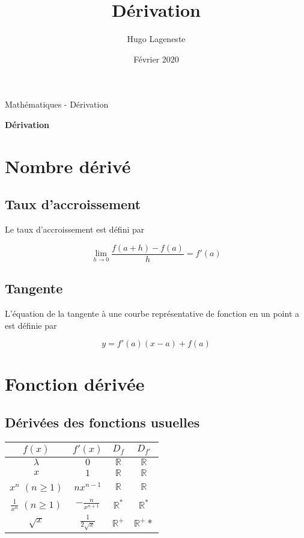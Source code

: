\documentclass[a4paper]{article}
\title{Dérivation}
\author{Hugo Lageneste}
\date{Février 2020}
\begin{document}
{Mathématiques - Dérivation}

\begin{center}
 \newcommand{\HRule}{\rule{\linewidth}{0.5mm}}
 {\huge \bfseries Dérivation}\\[0.1cm]
\end{center}

\section{Nombre dérivé}
\subsection{Taux d'accroissement}

{Le taux d'accroissement est défini par}

\[\lim\limits_{h \rightarrow 0}\frac{f(a+h)-f(a)}{h}=f\prime (a)\]

\subsection{Tangente}

{L'équation de la tangente à une courbe représentative de fonction en un point a est définie par}

\[y=f\prime(a)(x-a)+f(a)\]

\section{Fonction dérivée}

\subsection{Dérivées des fonctions usuelles}
\begin{center}
	\begin{tabular}{|c|c|c|c|}
  		\hline
  		$f(x)$ & $f\prime(x)$ & $D_f$ & $D_{f\prime}$ \\	
  		\hline
  		$\lambda$ & $0$ & $\mathbb{R}$ & $\mathbb{R}$ \\
  		\hline
  		$x$ & $1$ & $\mathbb{R}$ & $\mathbb{R}$ \\
  		\hline
  		$x^n$ $(n \geq 1)$ & $nx^{n-1}$ & $\mathbb{R}$ & $\mathbb{R}$ \\
  		\hline
  		$\frac{1}{x^n}$ $(n \geq 1)$ & $-\frac{n}{x^{n+1}}$ & $\mathbb{R}^*$ & $\mathbb{R}^*$ \\
  		\hline
  		$\sqrt{x}$ & $\frac{1}{2\sqrt{x}}$ & $\mathbb{R}^+$ & $\mathbb{R}^+*$ \\
  		\hline
	\end{tabular}
\end{center}
\end{document}
